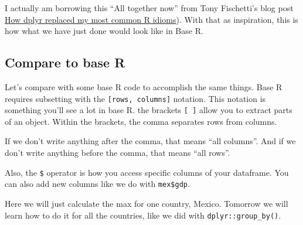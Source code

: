 \documentclass[]{book}
\newenvironment{Shaded}{\begin{snugshade}}{\end{snugshade}}
\newcommand{\KeywordTok}[1]{\textcolor[rgb]{0.13,0.29,0.53}{\textbf{{#1}}}}
\newcommand{\DataTypeTok}[1]{\textcolor[rgb]{0.13,0.29,0.53}{{#1}}}
\newcommand{\StringTok}[1]{\textcolor[rgb]{0.31,0.60,0.02}{{#1}}}
\newcommand{\OtherTok}[1]{\textcolor[rgb]{0.56,0.35,0.01}{{#1}}}
\newcommand{\NormalTok}[1]{{#1}}
\theoremstyle{definition}
\theoremstyle{definition}
\theoremstyle{definition}
\theoremstyle{remark}
\begin{document}
I actually am borrowing this ``All together now'' from Tony Fischetti's
blog post
\href{http://www.statsblogs.com/2014/02/10/how-dplyr-replaced-my-most-common-r-idioms/}{How
dplyr replaced my most common R idioms}). With that as inspiration, this
is how what we have just done would look like in Base R.

\subsection{Compare to base R}\label{compare-to-base-r}

Let's compare with some base R code to accomplish the same things. Base
R requires subsetting with the \texttt{{[}rows,\ columns{]}} notation.
This notation is something you'll see a lot in base R. the brackets
\texttt{{[}\ {]}} allow you to extract parts of an object. Within the
brackets, the comma separates rows from columns.

If we don't write anything after the comma, that means ``all columns''.
And if we don't write anything before the comma, that means ``all
rows''.

Also, the \texttt{\$} operator is how you access specific columns of
your dataframe. You can also add new columns like we do with
\texttt{mex\$gdp}.

Here we will just calculate the max for one country, Mexico. Tomorrow we
will learn how to do it for all the countries, like we did with
\texttt{dplyr::group\_by()}.

\begin{Shaded}
\end{Shaded}
\end{document}
